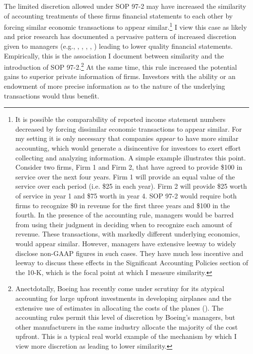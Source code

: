 \documentclass[thesis]{thesis-umich}
\begin{document}
The limited discretion allowed under SOP 97-2 may have increased the similarity of accounting treatments of these firms financial statements to each other by forcing similar economic transactions to appear similar.\footnote{It is possible the comparability of reported income statement numbers decreased by forcing dissimilar economic transactions to appear similar. For my setting it is only necessary that companies \emph{appear} to have more similar accounting, which would generate a disincentive for investors to exert effort collecting and analyzing information. A simple example illustrates this point. Consider two firms, Firm 1 and Firm 2, that have agreed to provide \$100 in service over the next four years. Firm 1 will provide an equal value of the service over each period (i.e. \$25 in each year). Firm 2 will provide \$25 worth of service in year 1 and \$75 worth in year 4. SOP 97-2 would require both firms to recognize \$0 in revenue for the first three years and \$100 in the fourth. In the presence of the accounting rule, managers would be barred from using their judgment in deciding when to recognize each amount of revenue. These transactions, with markedly different underlying economics, would appear similar. However, managers have extensive leeway to widely disclose non-GAAP figures in such cases. They have much less incentive and leeway to discuss these effects in the Significant Accounting Policies section of the 10-K, which is the focal point at which I measure similarity.} 
I view this case as likely and prior research has documented a pervasive pattern of increased discretion given to managers (e.g., \cite{dechowskinner2000}, \cite{beneish2001}, \cite{hribarjenkins2004}, \cite{beattyetal2002}, \cite{ayersetal2006}) leading to lower quality financial statements. Empirically, this is the association I document between similarity and the introduction of SOP 97-2.\footnote{Anectdotally, Boeing has recently come under scrutiny for its atypical accounting for large upfront investments in developing airplanes and the extensive use of estimates in allocating the costs of the planes (\cite{ostrower2014}). The accounting rules permit this level of discretion by Boeing's managers, but other manufacturers in the same industry allocate the majority of the cost upfront. This is a typical real world example of the mechanism by which I view more discretion as leading to lower similarity.} At the same time, this rule increased the potential gains to superior private information of firms. Investors with the ability or an endowment of more precise information as to the nature of the underlying transactions would thus benefit. 
\end{document}
